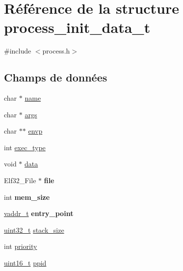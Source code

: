 \hypertarget{structprocess__init__data__t}{\section{\-Référence de la structure process\-\_\-init\-\_\-data\-\_\-t}
\label{structprocess__init__data__t}
}


{\ttfamily \#include $<$process.\-h$>$}

\subsection*{\-Champs de données}
\begin{DoxyCompactItemize}
\item 
char $\ast$ \hyperlink{structprocess__init__data__t_a6bdcab0bceaafa6e65a236904fb5a157}{name}
\item 
char $\ast$ \hyperlink{structprocess__init__data__t_a16d011771835f06e0bb3d5fd6115e13c}{args}
\item 
char $\ast$$\ast$ \hyperlink{structprocess__init__data__t_a863d82fbd718f53164a520f67376eac2}{envp}
\item 
int \hyperlink{structprocess__init__data__t_a1cda790f7d2446a04562094f09e358ab}{exec\-\_\-type}
\item 
void $\ast$ \hyperlink{structprocess__init__data__t_ae950cc2a2cc04d1c00a71f70c2fde72c}{data}
\item 
\hypertarget{structprocess__init__data__t_a423d726f5e4621a1aae6a6d96ed2c380}{\-Elf32\-\_\-\-File $\ast$ {\bfseries file}}\label{structprocess__init__data__t_a423d726f5e4621a1aae6a6d96ed2c380}

\item 
\hypertarget{structprocess__init__data__t_ae720e802d58d2f1457e34998063695a1}{int {\bfseries mem\-\_\-size}}\label{structprocess__init__data__t_ae720e802d58d2f1457e34998063695a1}

\item 
\hypertarget{structprocess__init__data__t_acf333ed57db9a2ca636801dcbc41da7e}{\hyperlink{types_8h_a53428b953a0ae6fba02a5b3596c867e0}{vaddr\-\_\-t} {\bfseries entry\-\_\-point}}\label{structprocess__init__data__t_acf333ed57db9a2ca636801dcbc41da7e}

\item 
\hyperlink{types_8h_a33594304e786b158f3fb30289278f5af}{uint32\-\_\-t} \hyperlink{structprocess__init__data__t_a8a9c2d2d0d602f8e2f3dc2f4c425da29}{stack\-\_\-size}
\item 
int \hyperlink{structprocess__init__data__t_a3147915ee1aa09fd84245e28635c60c8}{priority}
\item 
\hyperlink{types_8h_adf4d876453337156dde61095e1f20223}{uint16\-\_\-t} \hyperlink{structprocess__init__data__t_a34f85f3f56546700b1dc942070944e27}{ppid}
\end{DoxyCompactItemize}


